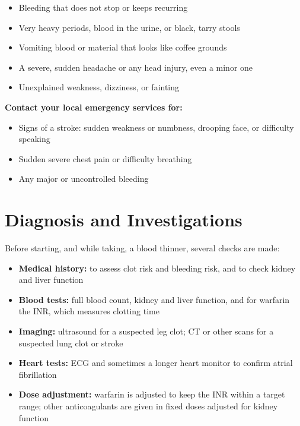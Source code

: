 \begin{itemize}
    \item Bleeding that does not stop or keeps recurring
    \item Very heavy periods, blood in the urine, or black, tarry stools
    \item Vomiting blood or material that looks like coffee grounds
    \item A severe, sudden headache or any head injury, even a minor one
    \item Unexplained weakness, dizziness, or fainting
\end{itemize}

\textbf{Contact your local emergency services for:}
\begin{itemize}
    \item Signs of a stroke: sudden weakness or numbness, drooping face, or difficulty speaking
    \item Sudden severe chest pain or difficulty breathing
    \item Any major or uncontrolled bleeding
\end{itemize}

\section*{Diagnosis and Investigations}
Before starting, and while taking, a blood thinner, several checks are made:

\begin{itemize}
    \item \textbf{Medical history:} to assess clot risk and bleeding risk, and to check kidney and liver function
    \item \textbf{Blood tests:} full blood count, kidney and liver function, and for warfarin the INR, which measures clotting time
    \item \textbf{Imaging:} ultrasound for a suspected leg clot; CT or other scans for a suspected lung clot or stroke
    \item \textbf{Heart tests:} ECG and sometimes a longer heart monitor to confirm atrial fibrillation
    \item \textbf{Dose adjustment:} warfarin is adjusted to keep the INR within a target range; other anticoagulants are given in fixed doses adjusted for kidney function
\end{itemize}

